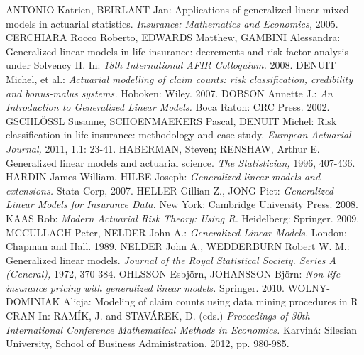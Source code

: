 \documentclass{amsart}
\theoremstyle{definition}\newtheorem{definition}[theorem]{Definition}
\theoremstyle{remark}\newtheorem{remark}[theorem]{Remark}
\begin{document}
\begin{thebibliography}{99}
ANTONIO Katrien, BEIRLANT Jan: Applications of generalized linear mixed models in actuarial statistics. {\it Insurance: Mathematics and Economics,} 2005.
CERCHIARA Rocco Roberto, EDWARDS Matthew, GAMBINI Alessandra: Generalized linear models in life insurance: decrements and risk factor analysis under Solvency II. In: {\it 18th International AFIR Colloquium.} 2008.
DENUIT Michel, et al.: {\it Actuarial modelling of claim counts: risk classification, credibility and bonus-malus systems.} Hoboken: Wiley. 2007.
DOBSON Annette J.: {\it An Introduction to Generalized Linear Models.} Boca Raton: CRC Press. 2002.
GSCHLÖSSL Susanne, SCHOENMAEKERS Pascal, DENUIT Michel: Risk classification in life insurance: methodology and case study. {\it European Actuarial Journal,} 2011, 1.1: 23-41.
HABERMAN, Steven; RENSHAW, Arthur E. Generalized linear models and actuarial science. {\it The Statistician,} 1996, 407-436.
HARDIN James William, HILBE Joseph: {\it Generalized linear models and extensions.} Stata Corp, 2007.
HELLER Gillian Z., JONG Piet: {\it Generalized Linear Models for Insurance Data.} New York: Cambridge University Press. 2008.
KAAS Rob: {\it Modern Actuarial Risk Theory: Using R.} Heidelberg: Springer. 2009.
MCCULLAGH Peter, NELDER John A.: {\it Generalized Linear Models.} London: Chapman and Hall. 1989.
NELDER John A., WEDDERBURN Robert W. M.: Generalized linear models. {\it Journal of the Royal Statistical Society. Series A (General),} 1972, 370-384.
OHLSSON Esbjörn, JOHANSSON Björn: {\it Non-life insurance pricing with generalized linear models.} Springer. 2010.
WOLNY-DOMINIAK Alicja: Modeling of claim counts using data mining procedures in R CRAN In: RAMÍK, J. and STAVÁREK, D. (eds.) 
{\it Proceedings of 30th International Conference Mathematical Methods in Economics.} Karviná: Silesian University, School of Business Administration, 2012, pp. 980-985.

\end{thebibliography}
\end{document}
